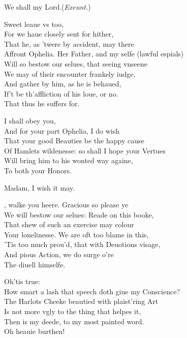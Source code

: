 \documentclass[a5paper,DIV=calc,11pt]{scrbook}
\begin{document}
\begin{drama*}
    \rosinspeaks We shall my Lord.\hfill(\textit{Exeunt.})
    
    \kingspeaks Sweet \queen leaue vs too,\\
    For we haue closely sent for \ham hither,\\
    That he, as 'twere by accident, may there\\
    Affront Ophelia. Her Father, and my selfe (lawful espials)\\
    Will so bestow our selues, that seeing vnseene\\
    We may of their encounter frankely iudge,\\
    And gather by him, as he is behaued,\\
    If't be th'affliction of his loue, or no.\\
    That thus he suffers for.
    
    \queenspeaks I shall obey you,\\
    And for your part Ophelia, I do wish\\
    That your good Beauties be the happy cause\\
    Of Hamlets wildenesse: so shall I hope your Vertues\\
    Will bring him to his wonted way againe,\\
    To both your Honors.
    
    \ophespeaks Madam, I wish it may.
    
    \polspeaks \ophe, walke you heere. Gracious so please ye\\
    We will bestow our selues: Reade on this booke,\\
    That shew of such an exercise may colour\\
    Your lonelinesse. We are oft too blame in this,\\
    'Tis too much prou'd, that with Deuotions visage,\\
    And pious Action, we do surge o're\\
    The diuell himselfe.
    
    \kingspeaks Oh'tis true:\\
    How smart a lash that speech doth giue my Conscience?\\
    The Harlots Cheeke beautied with plaist'ring Art\\
    Is not more vgly to the thing that helpes it,\\
    Then is my deede, to my most painted word.\\
    Oh heauie burthen!
    

\end{drama*}
\end{document}
